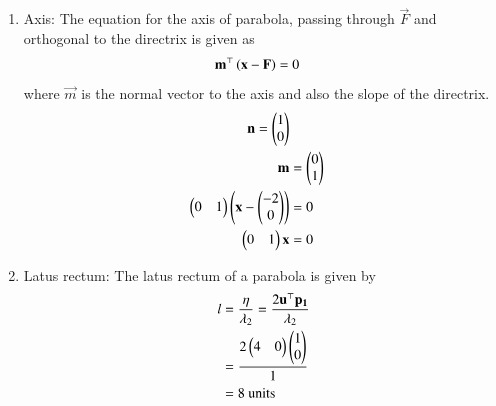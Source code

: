\documentclass[journal,12pt,twocolumn]{IEEEtran}
\begin{document}
\begin{enumerate}
\begin{enumerate}
\item Axis: The equation for the axis of parabola, passing through $\vec{F}$ and orthogonal to the directrix is given as  
\begin{align}
\mathbf{m}^\top\left(\mathbf{x}-\mathbf{F}\right) &= 0
\label{eq:5}
\end{align}
where $\vec{m}$ is the normal vector to the axis and also the slope of the directrix.
\begin{align}
\mathbf{n} = \begin{pmatrix}1 \\ 0 \end{pmatrix}\\
\mathbf{m} &= \begin{pmatrix}0 \\ 1\end{pmatrix} \\
\begin{pmatrix}0 & 1\end{pmatrix}\begin{pmatrix}\mathbf{x} - \begin{pmatrix}-2 \\ 0\end{pmatrix}\end{pmatrix} &= 0\\
\begin{pmatrix}0 & 1\end{pmatrix}\mathbf{x} &= 0 
\end{align}
\item Latus rectum: The latus rectum of a parabola is given by 
\begin{align}
	l &= \frac{\eta}{\lambda_2}  
	 = \frac{2\mathbf{u}^\top\mathbf{p_1}}{\lambda_2} \\
	 &= \frac{2\begin{pmatrix}4 & 0\end{pmatrix}\begin{pmatrix}1 \\ 0\end{pmatrix}}{1} \\
	 &= 8 \text{ units }
\end{align}
\end{enumerate}
\end{enumerate}
\end{document}
